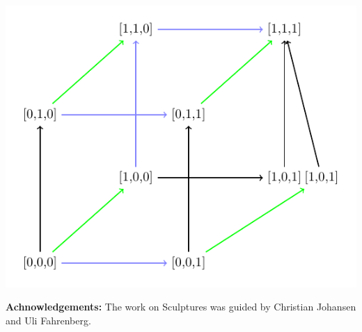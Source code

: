 \documentclass[9pt, english, a4paper]{article}
\theoremstyle{definition}
\begin{document}
	\includegraphics[scale=0.7]{illustrations/figure6.pdf}







	\noindent \textbf{Achnowledgements:} The work on Sculptures was guided by Christian Johansen and Uli Fahrenberg.
	
\end{document}

